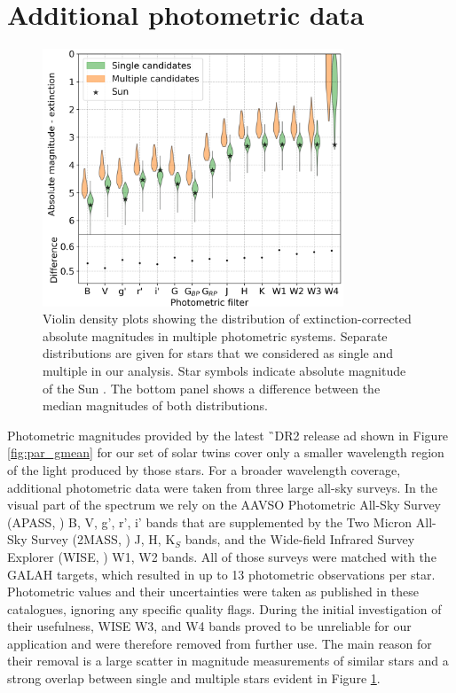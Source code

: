 \section{Additional photometric data}
\label{sec:data_triples}

\begin{figure}
	\centering
	\includegraphics[width=0.8\textwidth]{multimagplotebvc307.png}
	\caption{Violin density plots showing the distribution of extinction-corrected absolute magnitudes in multiple photometric systems. Separate distributions are given for stars that we considered as single and multiple in our analysis. Star symbols indicate absolute magnitude of the Sun \cite{2018ApJS..236...47W}. The bottom panel shows a difference between the median magnitudes of both distributions.}
	\label{fig:viol_photometry}
\end{figure}

Photometric magnitudes provided by the latest \G\ DR2 release \cite{2016A&A...595A...1G, 2018arXiv180409365G} ad shown in Figure \ref{fig:par_gmean} for our set of solar twins cover only a smaller wavelength region of the light produced by those stars. For a broader wavelength coverage, additional photometric data were taken from three large all-sky surveys. In the visual part of the spectrum we rely on the AAVSO Photometric All-Sky Survey (APASS, \cite{2015AAS...22533616H}) B, V, g', r', i' bands that are supplemented by the Two Micron All-Sky Survey (2MASS, \cite{2006AJ....131.1163S}) J, H, K$_S$ bands, and the Wide-field Infrared Survey Explorer (WISE, \cite{2010AJ....140.1868W}) W1, W2 bands. All of those surveys were matched with the GALAH targets, which resulted in up to 13 photometric observations per star. Photometric values and their uncertainties were taken as published in these catalogues, ignoring any specific quality flags. During the initial investigation of their usefulness, WISE W3, and W4 bands proved to be unreliable for our application and were therefore removed from further use. The main reason for their removal is a large scatter in magnitude measurements of similar stars and a strong overlap between single and multiple stars evident in Figure \ref{fig:viol_photometry}.

